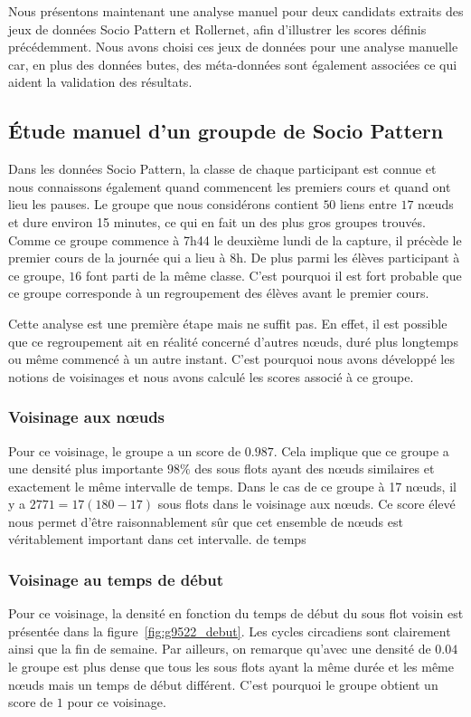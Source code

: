 
Nous présentons maintenant une analyse manuel pour deux candidats extraits des jeux de données Socio Pattern et Rollernet, afin d'illustrer les scores définis précédemment.
Nous avons choisi ces jeux de données pour une analyse manuelle car, en plus des données butes, des méta-données sont également associées ce qui aident la validation des résultats.

\subsection{\'Etude manuel d'un groupde de Socio Pattern}
Dans les données Socio Pattern, la classe de chaque participant est connue et nous connaissons également quand commencent les premiers cours et quand ont lieu les pauses.
Le groupe que nous considérons contient $50$ liens entre $17$ n\oe uds et dure environ 15 minutes, ce qui en fait un des plus gros groupes trouvés.
Comme ce groupe commence à 7h44 le deuxième lundi de la capture, il précède le premier cours de la journée qui a lieu à 8h.
De plus parmi les élèves participant à ce groupe, $16$ font parti de la même classe.
C'est pourquoi il est fort probable que ce groupe corresponde à un regroupement des élèves avant le premier cours.

Cette analyse est une première étape mais ne suffit pas.
En effet, il est possible que ce regroupement ait en réalité concerné d'autres n\oe uds, duré plus longtemps ou même commencé à un autre instant.
C'est pourquoi nous avons développé les notions de voisinages et nous avons calculé les scores associé à ce groupe.

\subsubsection*{Voisinage aux n\oe uds}
Pour ce voisinage, le groupe a un score de $0.987$.
Cela implique que ce groupe a une densité plus importante $98\%$ des sous flots ayant des n\oe uds similaires et exactement le même intervalle de temps.
Dans le cas de ce groupe à 17 n\oe uds, il y a $2771=17(180-17)$ sous flots dans le voisinage aux n\oe uds.
Ce score élevé nous permet d'être raisonnablement sûr que cet ensemble de n\oe uds est véritablement important dans cet intervalle. de temps

\subsubsection*{Voisinage au temps de début}
Pour ce voisinage, la densité en fonction du temps de début du sous flot voisin est présentée dans la figure~\ref{fig:g9522_debut}.
Les cycles circadiens sont clairement ainsi que la fin de semaine.
Par ailleurs, on remarque qu'avec une densité de $0.04$ le groupe est plus dense que tous les sous flots ayant la même durée et les même n\oe uds mais un temps de début différent.
C'est pourquoi le groupe obtient un score de $1$ pour ce voisinage.


